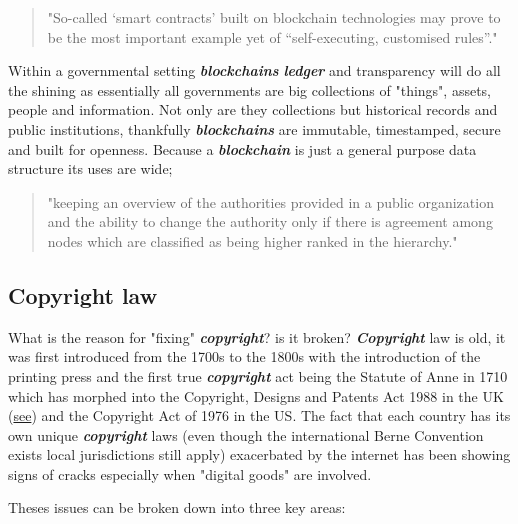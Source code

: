 \documentclass[12pt]{article}
\newcommand{\keyword}[1]{\textbf{\textit{#1}}}
\begin{document}
\begin{quote}
	"So-called ‘smart contracts’ built on blockchain technologies may prove to be the most important example yet of “self-executing, customised rules”." \cite{MILLARD2018843}
\end{quote}

Within a governmental setting \keyword{blockchains} \keyword{ledger} and transparency will do all the shining as essentially all governments are big collections of "things", assets, people and information. Not only are they collections but historical records and public institutions, thankfully \keyword{blockchains} are immutable, timestamped, secure and built for openness. Because a \keyword{blockchain} is just a general purpose data structure its uses are wide; \begin{quote}"keeping an overview of the authorities provided in a public organization and the ability to change the authority only if there is agreement among nodes which are classified as being higher ranked in the hierarchy." \cite{OLNES2017355}\end{quote}

\subsection{Copyright law}

What is the reason for "fixing" \keyword{copyright}? is it broken? \keyword{Copyright} law is old, it was first introduced from the 1700s to the 1800s with the introduction of the printing press and the first true \keyword{copyright} act being the Statute of Anne in 1710 which has morphed into the Copyright, Designs and Patents Act 1988 in the UK (\href{https://www.legislation.gov.uk/ukpga/1988/48/contents}{see}) and the Copyright Act of 1976 in the US. The fact that each country has its own unique \keyword{copyright} laws (even though the international Berne Convention exists local jurisdictions still apply) exacerbated by the internet has been showing signs of cracks especially when "digital goods" are involved.

Theses issues can be broken down into three key areas: 
\end{document}
